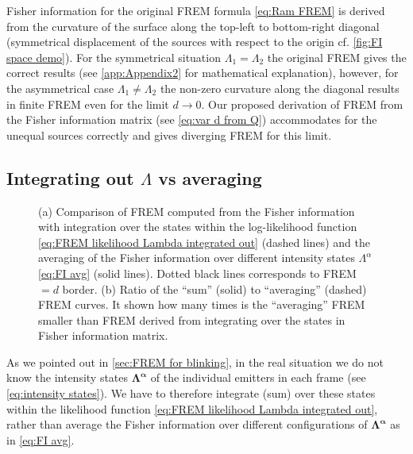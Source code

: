 Fisher information for the original FREM formula \autoref{eq:Ram FREM} is derived from the curvature of the surface along the top-left to bottom-right diagonal (symmetrical displacement of the sources with respect to the origin cf. \autoref{fig:FI space demo}). For the symmetrical situation $\Lambda_1=\Lambda_2$ the original FREM gives the correct results (see \autoref{app:Appendix2} for mathematical explanation), however, for the asymmetrical case $\Lambda_1\neq\Lambda_2$ the non-zero curvature along the diagonal results in finite FREM even for the limit $d\rightarrow 0$. Our proposed derivation of FREM from the Fisher information matrix (see \autoref{eq:var d from Q}) accommodates for the unequal sources correctly and gives diverging FREM for this limit. 


\subsection{Integrating out $\Lambda$ vs averaging\label{sub:Int out vs avg}}
\begin{figure}[!hbt]
	\centering
	\newcommand{\wf}{.49\textwidth}
		
		
	\caption{(a) Comparison of FREM computed from the Fisher information with integration over the states within the log-likelihood function \autoref{eq:FREM likelihood Lambda integrated out} (dashed lines) and the averaging of the Fisher information over different intensity states $\Lambda^{\alpha}$ \autoref{eq:FI avg} (solid lines). Dotted black lines corresponds to FREM$=d$ border. (b) Ratio of the ``sum'' (solid) to ``averaging'' (dashed) FREM curves. It shown how many times is the ``averaging'' FREM smaller than FREM derived from integrating over the states in Fisher information matrix.}
	\label{fig:FREM int out vs avg}
\end{figure}
% 
As we pointed out in \autoref{sec:FREM for blinking}, in the real situation we do not know the intensity states $\bm{\Lambda^{\alpha}}$ of the individual emitters in each frame (see \autoref{eq:intensity states}). We have to therefore integrate (sum) over these states within the likelihood function \autoref{eq:FREM likelihood Lambda integrated out}, rather than average the Fisher information over different configurations of $\bm{\Lambda^{\alpha}}$ as in \autoref{eq:FI avg}. 

